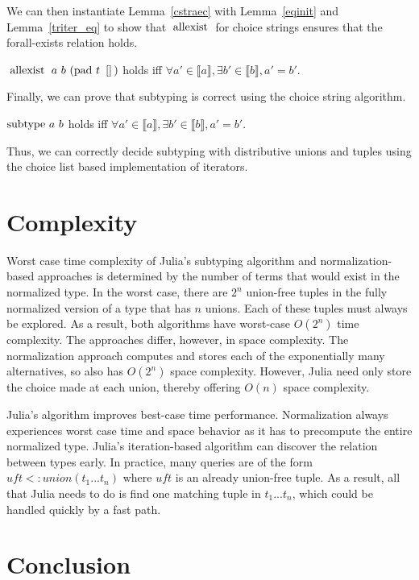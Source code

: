 \documentclass[a4paper,english]{lipics-v2019}
\newcommand{\denotes}[1]{\llbracket #1 \rrbracket}
\renewcommand{\c}[1]{\ensuremath{\text{\lstinline{#1}}}\xspace}
\begin{document}
\noindent We can then instantiate Lemma~\ref{cstraec} with
Lemma~\ref{eqinit} and Lemma~\ref{triter_eq} to show that \c{allexist} for
choice strings ensures that the forall-exists relation holds.
 
\begin{theorem}
$\c{allexist}~a~b~(\c{pad}~t~\c{[]})$
 holds iff $\forall a'\in\denotes{a},\exists b'\in\denotes{b}, a'=b'$.
\end{theorem}

\noindent Finally, we can prove that subtyping is correct using the choice
string algorithm.

\begin{theorem}
$\c{subtype}~a~b$ holds iff $\forall a'\in\denotes{a}, \exists
  b'\in\denotes{b}, a'=b'$.
\end{theorem}

\noindent
Thus, we can correctly decide subtyping with distributive unions and tuples
using the choice list based implementation of iterators.

\section{Complexity}

Worst case time complexity of Julia's subtyping algorithm and
normalization-based approaches is determined by the number of terms that
would exist in the normalized type. In the worst case, there are $2^n$
union-free tuples in the fully normalized version of a type that has $n$
unions.  Each of these tuples must always be explored. As a result, both
algorithms have worst-case $O(2^n)$ time complexity. The approaches differ,
however, in space complexity. The normalization approach computes and stores
each of the exponentially many alternatives, so also has $O(2^n)$ space
complexity. However, Julia need only store the choice made at each union,
thereby offering $O(n)$ space complexity.

Julia's algorithm improves best-case time performance.  Normalization always
experiences worst case time and space behavior as it has to precompute the
entire normalized type. Julia's iteration-based algorithm can discover the
relation between types early. In practice, many queries are of the form
$\mathit{uft} <: union(t_1...t_n)$ where $\mathit{uft}$ is an already
union-free tuple. As a result, all that Julia needs to do is find one matching
tuple in $t_1 ... t_n$, which could be handled quickly by a fast path.

\section{Conclusion}
\end{document}
